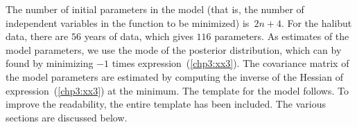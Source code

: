 \documentclass{admbmanual}
\begin{document}
The number of initial parameters in the model (that is, the number of
independent variables  in the function to be minimized)  is~$2n+4$. 
For the halibut data, there are $56$ years of data,
which gives $116$ parameters.  As estimates of the model
parameters, we use the mode of the posterior distribution,
which can by found by minimizing $-1$ times expression~(\ref{chp3:xx3}). %
 The covariance matrix of the model
parameters are estimated by computing the
inverse of the Hessian of expression~(\ref{chp3:xx3}) %
at the minimum. The template for the model follows. 
To improve the readability, the entire template has been
included. The various sections are discussed below.
\end{document}
